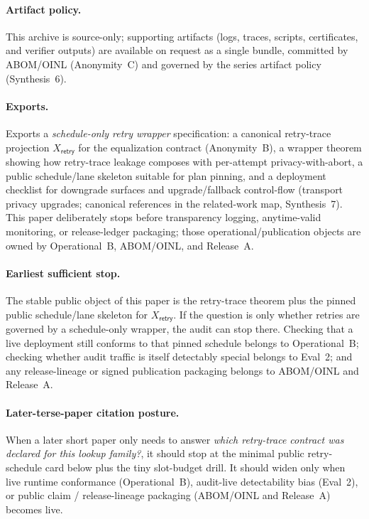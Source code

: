 \documentclass[11pt]{article}
\begin{document}
\paragraph{Artifact policy.} This archive is source-only; supporting artifacts (logs, traces, scripts, certificates, and verifier outputs) are available on request as a single bundle, committed by ABOM/OINL (Anonymity~C) and governed by the series artifact policy (Synthesis~6).\cite{series:artifactpolicy}

\paragraph{Exports.}
Exports a \emph{schedule-only retry wrapper} specification: a canonical retry-trace projection $X_{\mathsf{retry}}$ for the equalization contract (Anonymity~B),\cite{series:profiling}
a wrapper theorem showing how retry-trace leakage composes with per-attempt privacy-with-abort,
a public schedule/lane skeleton suitable for plan pinning,\cite{series:contractobjects}
and a deployment checklist for downgrade surfaces and upgrade/fallback control-flow (transport privacy upgrades; canonical references in the related-work map, Synthesis~7).\cite{series:relatedworkmap}
This paper deliberately stops before transparency logging, anytime-valid monitoring, or release-ledger packaging; those operational/publication objects are owned by Operational~B, ABOM/OINL, and Release~A.\cite{series:proofcarryingbudgets,series:advantagecontracts,series:releaseproperty}


\paragraph{Earliest sufficient stop.}
The stable public object of this paper is the retry-trace theorem plus the pinned public schedule/lane skeleton for $X_{\mathsf{retry}}$.
If the question is only whether retries are governed by a schedule-only wrapper, the audit can stop there.
Checking that a live deployment still conforms to that pinned schedule belongs to Operational~B; checking whether audit traffic is itself detectably special belongs to Eval~2; and any release-lineage or signed publication packaging belongs to ABOM/OINL and Release~A.\cite{series:operationalB,series:advantagecontracts,series:abom,series:releaseproperty}

\paragraph{Later-terse-paper citation posture.}
When a later short paper only needs to answer \emph{which retry-trace contract was declared for this lookup family?}, it should stop at the minimal public retry-schedule card below plus the tiny slot-budget drill.
It should widen only when live runtime conformance (Operational~B), audit-live detectability bias (Eval~2), or public claim / release-lineage packaging (ABOM/OINL and Release~A) becomes live.\cite{series:operationalB,series:advantagecontracts,series:abom,series:releaseproperty}
\end{document}
